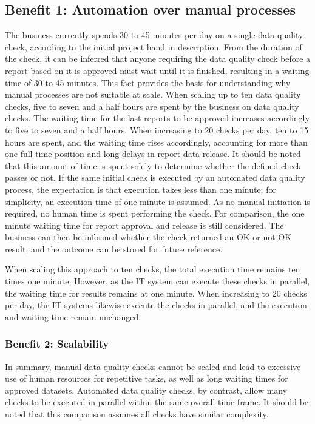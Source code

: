 \subsection*{Benefit 1: Automation over manual processes}
\label{SolutionReasonsAutomationOverManual}
The business currently spends 30 to 45 minutes per day on a single data quality check, according to the initial project hand in description. From the duration of the check, it can be inferred that anyone requiring the data quality check before a report based on it is approved must wait until it is finished, resulting in a waiting time of 30 to 45 minutes. This fact provides the basis for understanding why manual processes are not suitable at scale. When scaling up to ten data quality checks, five to seven and a half hours are spent by the business on data quality checks. The waiting time for the last reports to be approved increases accordingly to five to seven and a half hours. When increasing to 20 checks per day, ten to 15 hours are spent, and the waiting time rises accordingly, accounting for more than one full-time position and long delays in report data release. It should be noted that this amount of time is spent solely to determine whether the defined check passes or not.
If the same initial check is executed by an automated data quality process, the expectation is that execution takes less than one minute; for simplicity, an execution time of one minute is assumed. As no manual initiation is required, no human time is spent performing the check. For comparison, the one minute waiting time for report approval and release is still considered. The business can then be informed whether the check returned an OK or not OK result, and the outcome can be stored for future reference.

When scaling this approach to ten checks, the total execution time remains ten times one minute. However, as the IT system can execute these checks in parallel, the waiting time for results remains at one minute. When increasing to 20 checks per day, the IT systems likewise execute the checks in parallel, and the execution and waiting time remain unchanged.

\subsubsection*{Benefit 2: Scalability}
In summary, manual data quality checks cannot be scaled and lead to excessive use of human resources for repetitive tasks, as well as long waiting times for approved datasets. Automated data quality checks, by contrast, allow many checks to be executed in parallel within the same overall time frame. It should be noted that this comparison assumes all checks have similar complexity.

